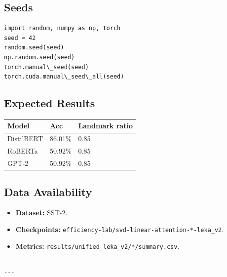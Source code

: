 \subsection{Seeds}

\begin{lstlisting}
import random, numpy as np, torch
seed = 42
random.seed(seed)
np.random.seed(seed)
torch.manual\_seed(seed)
torch.cuda.manual\_seed\_all(seed)
\end{lstlisting}

\subsection{Expected Results}

\begin{table}[H]
\centering
\small
\begin{tabular}{lll}
\toprule
\textbf{Model} & \textbf{Acc} & \textbf{Landmark ratio} \\
\midrule
DistilBERT & 86.01\% & 0.85 \\
RoBERTa & 50.92\% & 0.85 \\
GPT-2 & 50.92\% & 0.85 \\
\bottomrule
\end{tabular}
\end{table}

\subsection{Data Availability}

\begin{itemize}
\item \textbf{Dataset:} SST-2.
\item \textbf{Checkpoints:} \texttt{efficiency-lab/svd-linear-attention-*-leka\_v2}.
\item \textbf{Metrics:} \texttt{results/unified\_leka\_v2/*/summary.csv}.
\end{itemize}
\begin{lstlisting}

---
\end{lstlisting}